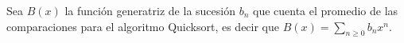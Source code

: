 Sea $B(x)$ la función generatriz de la sucesión $b_n$ que cuenta el promedio de las comparaciones para el algoritmo Quicksort, es decir que $B(x)=\sum_{n\geq 0}b_nx^n$.
